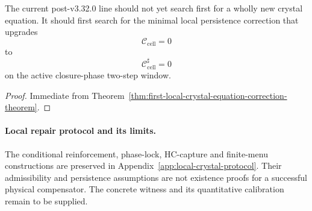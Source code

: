 \begin{corollary}
\label{cor:current-crystal-equation-working-rule}
The current post-v3.32.0 line should not yet search first for a wholly new crystal equation. It should first search for the minimal local persistence correction that upgrades
\[
  \mathcal C_{\mathrm{cell}}=0
\]
to
\[
  \mathcal C_{\mathrm{cell}}^{\sharp}=0
\]
on the active closure-phase two-step window.
\end{corollary}

\begin{proof}
Immediate from Theorem~\ref{thm:first-local-crystal-equation-correction-theorem}.
\end{proof}


\paragraph{Local repair protocol and its limits.}
The conditional reinforcement, phase-lock, HC-capture and finite-menu
constructions are preserved in Appendix~\ref{app:local-crystal-protocol}.
Their admissibility and persistence assumptions are not existence proofs
for a successful physical compensator. The concrete witness and its
quantitative calibration remain to be supplied.
